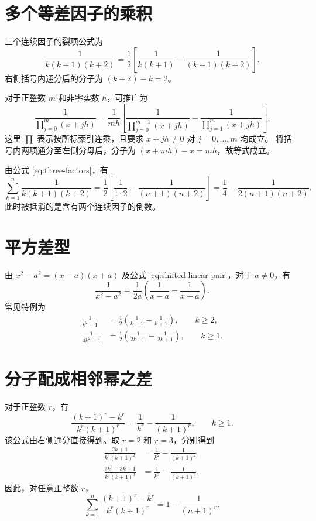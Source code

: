 \documentclass[UTF8,12pt,a4paper,fontset=fandol]{ctexart}
\begin{document}
\section{多个等差因子的乘积}

三个连续因子的裂项公式为
\begin{equation}\label{eq:three-factors}
  \boxed{\frac1{k(k+1)(k+2)}
  =\frac12\left[\frac1{k(k+1)}-\frac1{(k+1)(k+2)}\right]}.
\end{equation}
右侧括号内通分后的分子为 $(k+2)-k=2$。

对于正整数 $m$ 和非零实数 $h$，可推广为
\begin{equation}\label{eq:arithmetic-factors}
  \boxed{
  \frac1{\displaystyle\prod_{j=0}^{m}(x+jh)}
  =\frac1{mh}\left[
  \frac1{\displaystyle\prod_{j=0}^{m-1}(x+jh)}
  -\frac1{\displaystyle\prod_{j=1}^{m}(x+jh)}
  \right]}.
\end{equation}
这里 $\prod$ 表示按所标索引连乘，且要求 $x+jh\ne0$ 对 $j=0,\ldots,m$ 均成立。
将括号内两项通分至左侧分母后，分子为 $(x+mh)-x=mh$，故等式成立。

\begin{example}[三个连续因子的求和]
由公式 \eqref{eq:three-factors}，有
\[
  \sum_{k=1}^{n}\frac1{k(k+1)(k+2)}
  =\frac12\left[\frac1{1\cdot2}-\frac1{(n+1)(n+2)}\right]
  =\frac14-\frac1{2(n+1)(n+2)}.
\]
此时被抵消的是含有两个连续因子的倒数。
\end{example}

\section{平方差型}

由 $x^2-a^2=(x-a)(x+a)$ 及公式 \eqref{eq:shifted-linear-pair}，对于 $a\ne0$，有
\begin{equation}\label{eq:difference-of-squares}
  \boxed{\frac1{x^2-a^2}
  =\frac1{2a}\left(\frac1{x-a}-\frac1{x+a}\right)}.
\end{equation}
常见特例为
\begin{align*}
  \frac1{k^2-1}
  &=\frac12\left(\frac1{k-1}-\frac1{k+1}\right),\qquad k\ge2,\\
  \frac1{4k^2-1}
  &=\frac12\left(\frac1{2k-1}-\frac1{2k+1}\right),\qquad k\ge1.
\end{align*}

\section{分子配成相邻幂之差}

对于正整数 $r$，有
\begin{equation}\label{eq:power-difference}
  \boxed{\frac{(k+1)^r-k^r}{k^r(k+1)^r}
  =\frac1{k^r}-\frac1{(k+1)^r}},\qquad k\ge1.
\end{equation}
该公式由右侧通分直接得到。取 $r=2$ 和 $r=3$，分别得到
\begin{align*}
  \frac{2k+1}{k^2(k+1)^2}
  &=\frac1{k^2}-\frac1{(k+1)^2},\\
  \frac{3k^2+3k+1}{k^3(k+1)^3}
  &=\frac1{k^3}-\frac1{(k+1)^3}.
\end{align*}
因此，对任意正整数 $r$，
\[
  \sum_{k=1}^{n}\frac{(k+1)^r-k^r}{k^r(k+1)^r}
  =1-\frac1{(n+1)^r}.
\]
\end{document}
